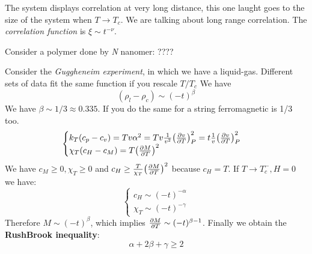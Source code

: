 \documentclass[../main/main.tex]{subfiles}
\begin{document}
The system displays correlation at very long distance, this one laught goes to the size of the system when \( T \rightarrow T_c \). We are talking about long range correlation. The \emph{correlation function} is \( \xi \sim t^{-\nu } \).
\begin{example}
Consider a polymer done by \emph{N} nanomer:
????


\end{example}


Consider the \emph{Guggheneim experiment}, in which we have a liquid-gas. Different sets of data fit the  same function if you rescale \( T/T_c \)
We have
\begin{equation}
  (\rho _l - \rho _c) \sim (-t)^{\beta}
  \label{eq:}
\end{equation}
We have \( \beta \sim 1/3 \approx 0.335 \). If you do the same for a string ferromagnetic is 1/3 too.
\begin{equation}
  \begin{cases}
   k_T (c_p-c_v)=T v \alpha ^2 = T v \frac{1}{v^2} \qty(\pdv{v}{T} )^2_P = t \frac{1}{v} \qty(\pdv{v}{T} )^2_P  \\
   \chi _T (c_H-c_M) = T \qty(\pdv{M}{T} )^2
  \end{cases}
\label{eq:}
\end{equation}
We have \( c_M \geq 0, \chi _T \geq 0  \) and  \(  c_H \geq \frac{T}{\chi _T} \qty(\pdv{M}{T} )^2 \) because \( c_H = T \). If \( T \rightarrow T_c^-, H=0 \) we have:
\begin{equation}
  \begin{cases}
   c_H \sim (-t)^{-\alpha }\\
   \chi _T \sim (-t)^{-\gamma  }
  \end{cases}
\label{eq:}
\end{equation}
Therefore \( M \sim (-t)^{\beta } \), which implies \( \pdv{M}{T} \sim (-t)^{\beta -1} \). Finally we obtain the \textbf{RushBrook inequality}:
\begin{equation}
  \alpha + 2 \beta  + \gamma \geq 2
  \label{eq:}
\end{equation}
\end{document}

